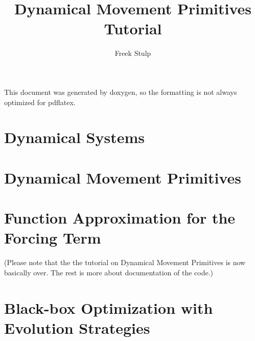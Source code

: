 \documentclass[a4paper,10pt]{book}
\author{Freek Stulp}
\title{Dynamical Movement Primitives Tutorial}
\begin{document}
\maketitle

This document was generated by doxygen, so the formatting is not always optimized for pdflatex.

\setcounter{tocdepth}{2}
\tableofcontents

\newpage



%
%

\chapter{Dynamical Systems}


\chapter{Dynamical Movement Primitives}







\chapter{Function Approximation for the Forcing Term}

(Please note that the the tutorial on Dynamical Movement Primitives is now basically over. The rest is more about documentation of the code.)



\chapter{Black-box Optimization with Evolution Strategies}



%
%
\end{document}
